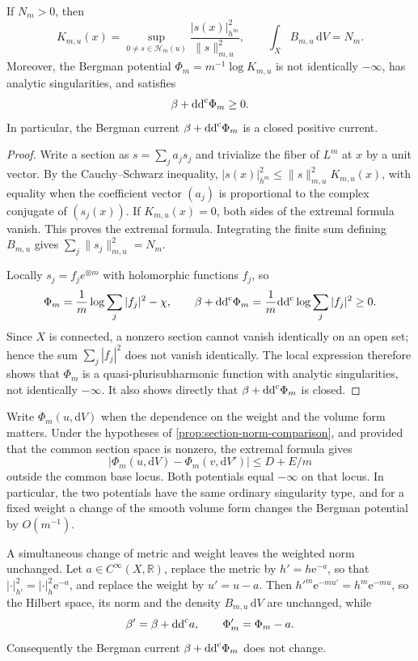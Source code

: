 \begin{proposition}\label{prop:finite-bergman-identities}
If $N_m>0$, then
\[
 K_{m,u}(x)=\sup_{0\neq s\in\mathcal H_m(u)}
                   \frac{|s(x)|_{h^m}^2}{\|s\|_{m,u}^2},
 \qquad \int_X B_{m,u}\,\mathrm{d}V=N_m.
\]
Moreover, the Bergman potential $\Phi_m=m^{-1}\log K_{m,u}$ is not identically $-\infty$, has analytic singularities, and satisfies
\[
 \beta+\mathrm{dd}^{\mathrm{c}}\Phi_m\geq0.
\]
In particular, the Bergman current $\beta+\mathrm{dd}^{\mathrm{c}}\Phi_m$ is a closed positive current.
\end{proposition}
\begin{proof}
Write a section as $s=\sum_ja_js_j$ and trivialize the fiber of $L^m$ at $x$ by a unit vector. By the Cauchy--Schwarz inequality, $|s(x)|_{h^m}^2\leq\|s\|_{m,u}^2K_{m,u}(x)$, with equality when the coefficient vector $(a_j)$ is proportional to the complex conjugate of $(s_j(x))$. If $K_{m,u}(x)=0$, both sides of the extremal formula vanish. This proves the extremal formula. Integrating the finite sum defining $B_{m,u}$ gives $\sum_j\|s_j\|_{m,u}^2=N_m$.

Locally $s_j=f_j e^{\otimes m}$ with holomorphic functions $f_j$, so
\[
 \Phi_m=\frac1m\log\sum_j|f_j|^2-\chi,
 \qquad
 \beta+\mathrm{dd}^{\mathrm{c}}\Phi_m=\frac1m\mathrm{dd}^{\mathrm{c}}\log\sum_j|f_j|^2\geq0.
\]
Since $X$ is connected, a nonzero section cannot vanish identically on an open set; hence the sum $\sum_j|f_j|^2$ does not vanish identically. The local expression therefore shows that $\Phi_m$ is a quasi-plurisubharmonic function with analytic singularities, not identically $-\infty$. It also shows directly that $\beta+\mathrm{dd}^{\mathrm{c}}\Phi_m$ is closed.
\end{proof}

Write $\Phi_m(u,\mathrm{d}V)$ when the dependence on the weight and the volume form matters. Under the hypotheses of \cref{prop:section-norm-comparison}, and provided that the common section space is nonzero, the extremal formula gives
\[
 |\Phi_m(u,\mathrm{d}V)-\Phi_m(v,\mathrm{d}V')|\leq D+E/m
\]
outside the common base locus. Both potentials equal $-\infty$ on that locus. In particular, the two potentials have the same ordinary singularity type, and for a fixed weight a change of the smooth volume form changes the Bergman potential by $O(m^{-1})$.

A simultaneous change of metric and weight leaves the weighted norm unchanged. Let $a\in C^\infty(X,\mathbb R)$, replace the metric by $h'=h\mathrm{e}^{-a}$, so that $|\cdot|_{h'}^2=|\cdot|_h^2\mathrm{e}^{-a}$, and replace the weight by $u'=u-a$. Then $h'^m\mathrm{e}^{-mu'}=h^m\mathrm{e}^{-mu}$, so the Hilbert space, its norm and the density $B_{m,u}\,\mathrm{d}V$ are unchanged, while
\[
 \beta'=\beta+\mathrm{dd}^{\mathrm{c}} a,\qquad \Phi'_m=\Phi_m-a.
\]
Consequently the Bergman current $\beta+\mathrm{dd}^{\mathrm{c}}\Phi_m$ does not change.

